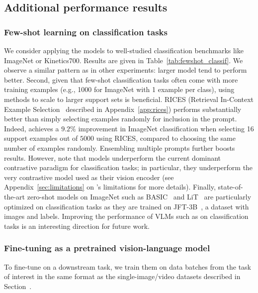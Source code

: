 \subsection{Additional performance results}
\label{app:more_performance}

\subsubsection{Few-shot learning on classification tasks}
\label{app:classif_tasks}



We consider applying the \method{} models to well-studied classification benchmarks like ImageNet or Kinetics700. Results are given in Table~\ref{tab:fewshot_classif}.
We observe a similar pattern as in
other experiments:
larger model tend to perform better.
Second, given that few-shot classification tasks often come with more training examples (e.g., 1000 for ImageNet with 1 example per class), using methods to scale to larger support sets is beneficial. 
RICES (Retrieval In-Context Example Selection~\citep{yang2021empirical} described in Appendix~\ref{app:rices}) performs substantially better than simply selecting examples randomly for inclusion in the prompt.
Indeed, \largem{} achieves a $9.2\%$ improvement in ImageNet classification when selecting 16 support examples out of $5000$ using RICES, compared to choosing the same number of examples randomly. 
Ensembling multiple prompts further boosts results.
However, note that \method{} models underperform the current dominant contrastive paradigm for classification tasks;
in particular, they underperform the very contrastive model used as their vision encoder (see Appendix~\ref{sec:limitations} on \method{}'s limitations for more details).
Finally, state-of-the-art zero-shot models on ImageNet such as BASIC~\citep{pham2021combined} and LiT~\citep{zhai2021lit} are particularly optimized on classification tasks as they are trained on JFT-3B~\citep{jft3b}, a dataset with images and labels.
Improving the performance of VLMs such as \method{} on classification tasks is an interesting direction for future work.


\subsubsection{Fine-tuning \largem{} as a pretrained vision-language model}
\label{app:finetuning}

To fine-tune \methodfamily{} on a downstream task, we train them on data batches from the task of interest in the same format as the single-image/video datasets described in Section~.


